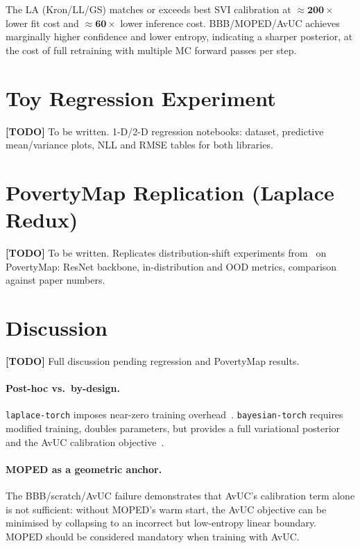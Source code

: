 \documentclass[12pt,a4paper]{article}
\newcommand{\todo}[1]{\noindent\colorbox{yellow!40}{\parbox{\dimexpr\linewidth-2\fboxsep}{\textbf{[TODO]} #1}}}
\begin{document}
The LA (Kron/LL/GS) matches or exceeds best SVI calibration at
$\mathbf{\approx200\times}$ lower fit cost and $\mathbf{\approx60\times}$
lower inference cost. BBB/MOPED/AvUC achieves marginally higher confidence
and lower entropy, indicating a sharper posterior, at the cost of full
retraining with multiple MC forward passes per step.

\section{Toy Regression Experiment}
\label{sec:regression}

\todo{To be written. 1-D/2-D regression notebooks: dataset, predictive
  mean/variance plots, NLL and RMSE tables for both libraries.}

\section{PovertyMap Replication (Laplace Redux)}
\label{sec:povertymap}

\todo{To be written. Replicates distribution-shift experiments
  from~\citet{daxberger2021laplace} on PovertyMap: ResNet backbone,
  in-distribution and OOD metrics, comparison against paper numbers.}

\section{Discussion}
\label{sec:discussion}

\todo{Full discussion pending regression and PovertyMap results.}

\paragraph{Post-hoc vs.\ by-design.}
\texttt{laplace-torch} imposes near-zero training overhead~\citep{daxberger2021laplace}.
\texttt{bayesian-torch} requires modified training, doubles parameters, but
provides a full variational posterior and the AvUC calibration
objective~\citep{intel2021bayesiantorch,blundell2015weight}.

\paragraph{MOPED as a geometric anchor.}
The BBB/scratch/AvUC failure demonstrates that AvUC's calibration term alone
is not sufficient: without MOPED's warm start, the AvUC objective can be
minimised by collapsing to an incorrect but low-entropy linear boundary.
MOPED should be considered mandatory when training with AvUC.
\end{document}
